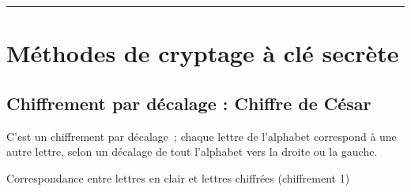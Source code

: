
\newcommand{\numTD}{TD4}
\newcommand{\themeTD}{Sécurité et Cryptographie}



\hrule

\noindent{}


\section{Méthodes de cryptage à clé secrète}

\subsection{Chiffrement par décalage : Chiffre de César}

C'est un chiffrement par décalage ; chaque lettre de l’alphabet correspond à une autre lettre, selon un décalage de tout l'alphabet vers la droite ou la gauche.

\begin{table}[h]
\begin{tiny}

\end{tiny}
\caption{\label{Cesar1}Correspondance entre lettres en clair et lettres chiffrées (chiffrement 1)}%
\end{table}

